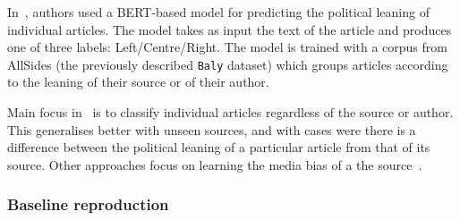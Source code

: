 In~\citet{baly2020we}, authors used a BERT-based model for predicting the political leaning of individual articles. The model takes as input the text of the article and produces one of three labels: Left/Centre/Right. The model is trained with a corpus from AllSides  (the previously described \texttt{Baly} dataset) which groups articles %
according to the leaning of their source or of their author. %


Main focus in~\citet{baly2020we} is to classify individual articles regardless of the source or author. This generalises better with unseen sources, and with cases were there is a difference between the political leaning of a particular article from that of its source.
Other approaches focus on learning the media bias of a the source~\citep{baly2020written,biessmann2016automating}.



\subsubsection{\statusgreen Baseline reproduction}
\label{ssec:ps_leaning_classifier}








